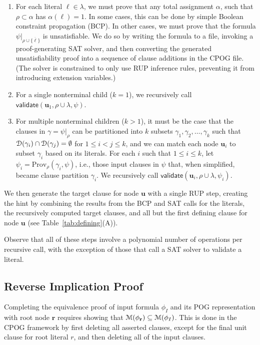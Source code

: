 \documentclass[letterpaper,USenglish,cleveref, autoref, thm-restate]{lipics-v2021}
\newcommand{\obar}[1]{\overline{#1}}
\newcommand{\lit}{\ell}
\newcommand{\dependencyset}{{\cal D}}
\newcommand{\imply}{\Rightarrow}
\newcommand{\passign}{\rho}
\newcommand{\modelset}{{\cal M}}
\newcommand{\validate}{\textsf{validate}}
\newcommand{\prov}{\textrm{Prov}}
\newcommand{\inputformula}{\phi_I}
\newcommand{\makenode}[1]{\mathbf{#1}}
\newcommand{\nodeu}{\makenode{u}}
\newcommand{\noder}{\makenode{r}}
\newcommand{\simplify}[2]{#1|_{#2}}
\begin{document}
\begin{enumerate}
\begin{enumerate}
    \item For each literal
  $\lit \in \lambda$, we must prove that any total assignment $\alpha$, such that
  $\passign \subset \alpha$ has $\alpha(\lit) = 1$.  In some
  cases, this can be done by simple Boolean constraint propagation (BCP).
  In other cases, we must prove that the formula
  $\simplify{\psi}{\passign \cup \{\obar{\lit}\}}$ is unsatisfiable.  We
  do so by writing the formula to a file, invoking a proof-generating
  SAT solver, and then converting the generated unsatisfiability proof
  into a sequence of clause additions in the CPOG file.
  (The solver is constrained to only use RUP inference rules, preventing it from introducing extension variables.)
\item For a single nonterminal child ($k = 1$), we recursively call
  $\validate \left(\nodeu_1, \passign \cup \lambda, \psi\right)$.
\item For multiple nonterminal children ($k > 1$),
  it must be the case that the clauses in
  $\gamma = \simplify{\psi}{\passign}$ can be partitioned into $k$ subsets
  $\gamma_1, \gamma_2, \ldots, \gamma_k$ such that $\dependencyset(\gamma_i)
  \cap \dependencyset(\gamma_j) = \emptyset$ for $1 \leq i < j \leq k$,
  and we can match each node $\nodeu_i$ to subset $\gamma_i$ based on its
  literals.
  For each $i$ such that $1 \leq i \leq k$, let $\psi_i = \prov_{\passign}(\gamma_i, \psi)$, i.e., those input clauses in $\psi$ that, when simplified, became clause partition $\gamma_i$.
  We recursively call
  $\validate \left(\nodeu_i, \passign \cup \lambda, \psi_i\right)$.
\end{enumerate}
  We then generate the target clause for node $\nodeu$ with a single RUP step,
creating the hint by combining the results from the BCP and SAT calls for
  the literals, the recursively computed target clauses, and all but
  the first defining clause for node $\nodeu$
(see Table~\ref{tab:defining}(A)).
\end{enumerate}
Observe that
all of these steps involve a polynomial number of
operations per recursive call, with the exception of those that call
a SAT solver to validate a literal.

\subsection{Reverse Implication Proof}

Completing the equivalence proof of input formula $\inputformula$ and its POG
representation with root node $\noder$ requires showing that
$\modelset(\phi_\noder) \subseteq \modelset(\inputformula)$.  This is done in the
CPOG framework by first deleting all asserted clauses, except for the
final unit clause for root literal $r$, and then deleting all of the
input clauses.
\end{document}
